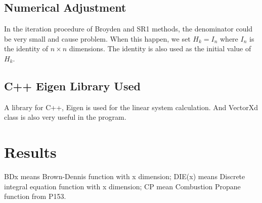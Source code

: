 \documentclass{article}
\begin{document}
\subsection{Numerical Adjustment}
In the iteration procedure of Broyden and SR1 methods, the denominator could be very small and cause problem. When this happen, we set $H_k = I_n$ where $I_n$ is the identity of $n\times n$ dimensions. The identity is also used as the initial value of ${H_k}$.

\subsection{C++ Eigen Library Used}
A library for C++, Eigen is used for the linear system calculation. And VectorXd class is also very useful in the program.

\section{Results}
BD{x} means Brown-Dennis function with x dimension;
DIE(x) means Discrete integral equation function with x dimension;
CP mean Combustion Propane function from P153.
\end{document}
